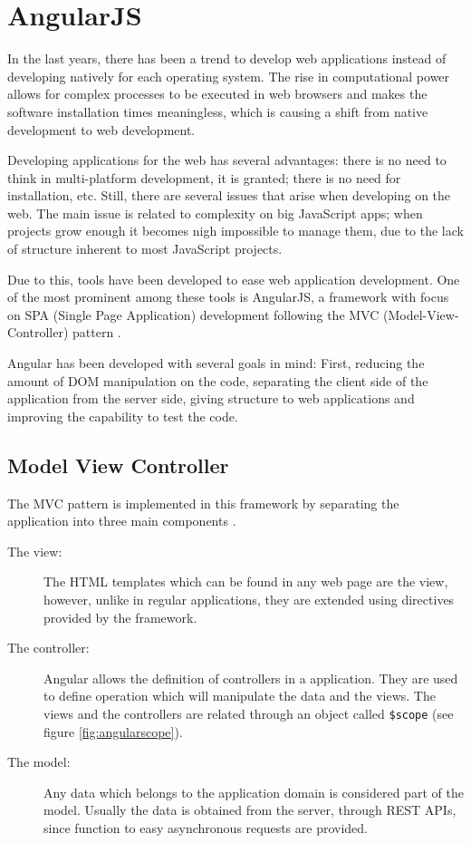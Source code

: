 \section*{AngularJS}

In the last years, there has been a trend to develop web applications instead of developing natively for each operating system. The rise in computational power allows for complex processes to be executed in web browsers and makes the software installation times meaningless, which is causing a shift from native development to web development.

Developing applications for the web has several advantages: there is no need to think in multi-platform development, it is granted; there is no need for installation, etc. Still, there are several issues that arise when developing on the web. The main issue is related to complexity on big JavaScript apps; when projects grow enough it becomes nigh impossible to manage them, due to the lack of structure inherent to most JavaScript projects.

Due to this, tools have been developed to ease web application development. One of the most prominent among these tools is AngularJS, a framework with focus on SPA (Single Page Application) development following the MVC (Model-View-Controller) pattern \cite{angularjs1, angularjs2}.

Angular has been developed with several goals in mind: First, reducing the amount of DOM manipulation on the code, separating the client side of the application from the server side, giving structure to web applications and improving the capability to test the code.

\subsection*{Model View Controller}

The MVC pattern is implemented in this framework by separating the application into three main components \cite{angularjs3}.

\begin{description}
\item[The view:] The HTML templates which can be found in any web page are the view, however, unlike in regular applications, they are extended using directives provided by the framework.
\item[The controller:] Angular allows the definition of controllers in a application. They are used to define operation which will manipulate the data and the views. The views and the controllers are related through an object called \texttt{\$scope} (see figure \ref{fig:angularscope}).
\item[The model:] Any data which belongs to the application domain is considered part of the model. Usually the data is obtained from the server, through REST APIs, since function to easy asynchronous requests are provided.
\end{description}

